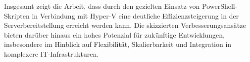 \documentclass[conference]{IEEEtran}
\begin{document}
Insgesamt zeigt die Arbeit, dass durch den gezielten Einsatz von PowerShell-Skripten in Verbindung mit Hyper-V eine deutliche Effizienzsteigerung in der Serverbereitstellung erreicht werden kann.  
Die skizzierten Verbesserungsansätze bieten darüber hinaus ein hohes Potenzial für zukünftige Entwicklungen, insbesondere im Hinblick auf Flexibilität, Skalierbarkeit und Integration in komplexere IT-Infrastrukturen.



\end{document}
